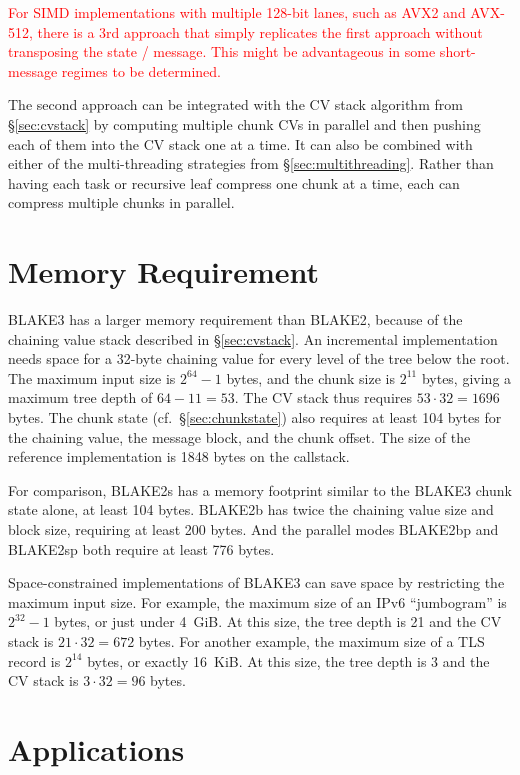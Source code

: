\documentclass[12pt,notitlepage,a4paper]{article}
\newcommand{\alert}[1]{\textcolor{red}{#1}}
\begin{document}
\alert{For SIMD implementations with multiple 128-bit lanes, such as AVX2 and AVX-512, there is a 3rd approach that simply replicates the first approach without transposing the state / message. This might be advantageous in some short-message regimes to be determined.}

The second approach can be integrated with the CV stack algorithm from
\S\ref{sec:cvstack} by computing multiple chunk CVs in parallel and then
pushing each of them into the CV stack one at a time. It can also be combined
with either of the multi-threading strategies from \S\ref{sec:multithreading}.
Rather than having each task or recursive leaf compress one chunk at a time,
each can compress multiple chunks in parallel.

\section{Memory Requirement}\label{sec:memory}

BLAKE3 has a larger memory requirement than BLAKE2, because of the chaining
value stack described in \S\ref{sec:cvstack}. An incremental implementation
needs space for a 32-byte chaining value for every level of the tree below the
root. The maximum input size is $2^{64}-1$ bytes, and the chunk size is
$2^{11}$ bytes, giving a maximum tree depth of $64 - 11 = 53$. The CV stack
thus requires $53 \cdot 32 = 1696$ bytes. The chunk state
(cf.~\S\ref{sec:chunkstate}) also requires at least 104 bytes for the chaining
value, the message block, and the chunk offset. The size of the reference
implementation is 1848 bytes on the callstack.

For comparison, BLAKE2s has a memory footprint similar to the BLAKE3 chunk
state alone, at least 104 bytes. BLAKE2b has twice the chaining value size and
block size, requiring at least 200 bytes. And the parallel modes BLAKE2bp and
BLAKE2sp both require at least 776 bytes.

Space-constrained implementations of BLAKE3 can save space by restricting the
maximum input size. For example, the maximum size of an IPv6 ``jumbogram'' is
$2^{32}-1$ bytes, or just under 4~GiB. At this size, the tree depth is 21 and
the CV stack is $21 \cdot 32 = 672$ bytes. For another example, the maximum
size of a TLS record is $2^{14}$ bytes, or exactly 16~KiB. At this size, the
tree depth is 3 and the CV stack is $3 \cdot 32 = 96$ bytes.

\section{Applications}\label{sec:applications}
\end{document}
